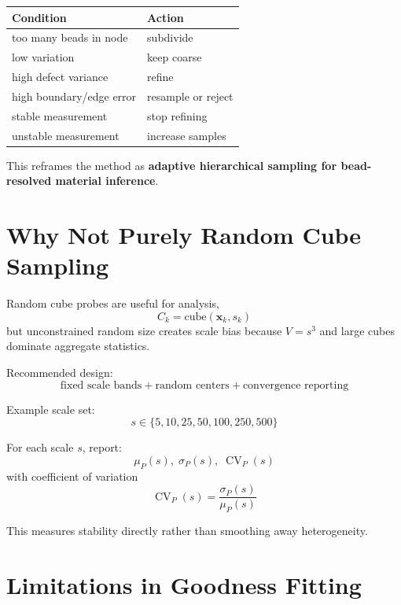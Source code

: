 \documentclass[11pt, a4paper, oneside]{article}
\DeclareMathOperator{\CV}{CV}
\begin{document}
\begin{center}
\begin{tabularx}{\linewidth}{lX}
\toprule
Condition & Action \\
\midrule
too many beads in node & subdivide \\
low variation & keep coarse \\
high defect variance & refine \\
high boundary/edge error & resample or reject \\
stable measurement & stop refining \\
unstable measurement & increase samples \\
\bottomrule
\end{tabularx}
\end{center}

This reframes the method as \textbf{adaptive hierarchical sampling for bead-resolved material inference}.

\section{Why Not Purely Random Cube Sampling}

Random cube probes are useful for analysis,
\begin{equation}
C_k = \mathrm{cube}(\mathbf{x}_k, s_k)
\end{equation}
but unconstrained random size creates scale bias because $V=s^3$ and large cubes dominate aggregate statistics.

Recommended design:
\begin{equation}
\text{fixed scale bands} + \text{random centers} + \text{convergence reporting}
\end{equation}

Example scale set:
\begin{equation}
s \in \{5,10,25,50,100,250,500\}
\end{equation}

For each scale $s$, report:
\begin{equation}
\mu_P(s),\; \sigma_P(s),\; \CV_P(s)
\end{equation}
with coefficient of variation
\begin{equation}
\CV_P(s) = \frac{\sigma_P(s)}{\mu_P(s)}
\end{equation}

This measures stability directly rather than smoothing away heterogeneity.

\section{Limitations in Goodness Fitting}
\end{document}
